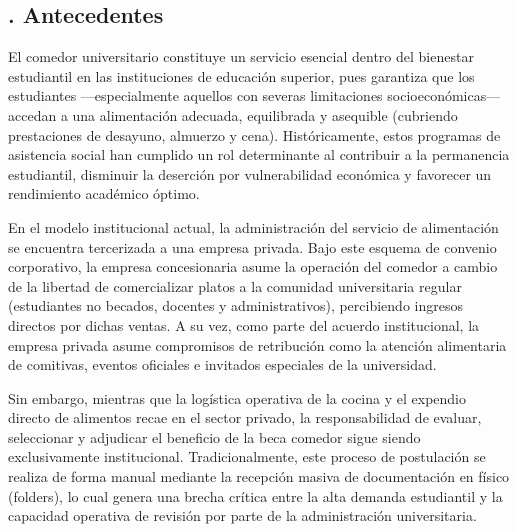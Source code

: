 \subsection{. Antecedentes}\label{sec:antecedentes}

El comedor universitario constituye un servicio esencial dentro del bienestar estudiantil en las instituciones de educación superior, pues garantiza que los estudiantes —especialmente aquellos con severas limitaciones socioeconómicas— accedan a una alimentación adecuada, equilibrada y asequible (cubriendo prestaciones de desayuno, almuerzo y cena). Históricamente, estos programas de asistencia social han cumplido un rol determinante al contribuir a la permanencia estudiantil, disminuir la deserción por vulnerabilidad económica y favorecer un rendimiento académico óptimo.

En el modelo institucional actual, la administración del servicio de alimentación se encuentra tercerizada a una empresa privada. Bajo este esquema de convenio corporativo, la empresa concesionaria asume la operación del comedor a cambio de la libertad de comercializar platos a la comunidad universitaria regular (estudiantes no becados, docentes y administrativos), percibiendo ingresos directos por dichas ventas. A su vez, como parte del acuerdo institucional, la empresa privada asume compromisos de retribución como la atención alimentaria de comitivas, eventos oficiales e invitados especiales de la universidad.

Sin embargo, mientras que la logística operativa de la cocina y el expendio directo de alimentos recae en el sector privado, la responsabilidad de evaluar, seleccionar y adjudicar el beneficio de la beca comedor sigue siendo exclusivamente institucional. Tradicionalmente, este proceso de postulación se realiza de forma manual mediante la recepción masiva de documentación en físico (folders), lo cual genera una brecha crítica entre la alta demanda estudiantil y la capacidad operativa de revisión por parte de la administración universitaria.
